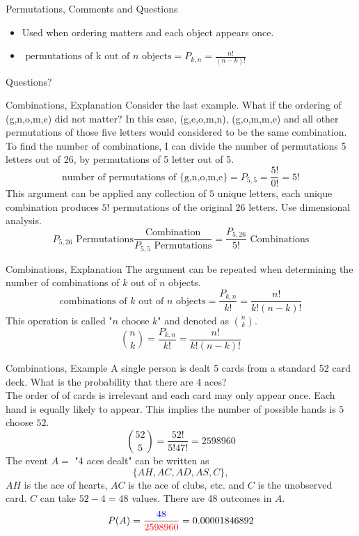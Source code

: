 \documentclass[handout]{beamer}
\newcommand{\blue}[1]{{\color{blue} #1}}
\newcommand{\red}[1]{{\color{red} #1}}
\newcommand{\qtns}[0]{\begin{center} Questions? \end{center}}
\newcommand{\nl}[1]{\vspace{#1 em}}
\begin{document}
\begin{frame}{Permutations, Comments and Questions}
    \begin{itemize}
        \item Used when ordering matters and each object appears once.
        \item $\text{ permutations of } $k$ \text{ out of } n \text{ objects} = P_{k,n} = \frac{n!}{(n-k)!}$
    \end{itemize}
    \qtns
\end{frame}

\begin{frame}{Combinations, Explanation}
    Consider the last example. What if the ordering of (g,n,o,m,e) did not matter? \pause In this case, (g,e,o,m,n), (g,o,m,m,e) and all other permutations of those five letters would considered to be the same combination. To find the number of combinations, I can divide the number of permutations 5 letters out of 26, by permutations of 5 letter out of 5.
    \[\text{number of permutations of \{g,n,o,m,e\} } = P_{5,5} = \frac{5!}{0!} = 5!\]
    \pause This argument can be applied any collection of $5$ unique letters, each unique combination produces $5!$ permutations of the original 26 letters. Use dimensional analysis.
    \[P_{5,26} \text{ Permutations} \frac{\text{Combination}}{P_{5,5} \text{ Permutations}} = \frac{P_{5,26}}{5!} \text{ Combinations}\]
\end{frame}

\begin{frame}{Combinations, Explanation}
    The argument can be repeated when determining the number of combinations of $k$ out of $n$ objects.
    \\
    \nl{0.5}
    \[\text{combinations of } k \text{ out of } n \text{ objects} = \frac{P_{k,n}}{k!} = \frac{n!}{k!(n-k)!}\]
    This operation is called "$n$ choose $k$" and denoted as $\binom{n}{k}$.
    \[\binom{n}{k} = \frac{P_{k,n}}{k!} = \frac{n!}{k!(n-k)!}\]
\end{frame}

\begin{frame}{Combinations, Example}
    A single person is dealt 5 cards from a standard 52 card deck. What is the probability that there are 4 aces?\\
    \nl{0.5}
    \pause The order of of cards is irrelevant and each card may only appear once. Each hand is equally likely to appear. This implies the \red{number of possible hands is $5$ choose $52$}.
    \[\binom{52}{5} = \frac{52!}{5!47!} = 2598960\]
    \pause The event $A =$ "4 aces dealt" can be written as 
    \[\{ AH, AC,AD,AS, C \},\]
    $AH$ is the ace of hearts, $AC$ is the ace of clubs, etc. and $C$ is the unobserved card. $C$ can take $52-4 = 48$ values. \pause There are \blue{48 outcomes in $A$}.
    \[P(A) = \frac{\blue{48}}{\red{2598960}} = 0.00001846892\]
\end{frame}
\end{document}
